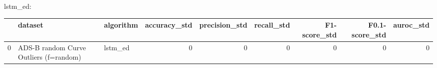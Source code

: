 lstm_ed:

\begin{tabular}{rllrrrrrr}
\hline
    & dataset                                & algorithm   &   accuracy\_std &   precision\_std &   recall\_std &   F1-score\_std &   F0.1-score\_std &   auroc\_std \\
\hline
  0 & ADS-B random Curve Outliers (f=random) & lstm\_ed     &              0 &               0 &            0 &              0 &                0 &           0 \\
\hline
\end{tabular}

